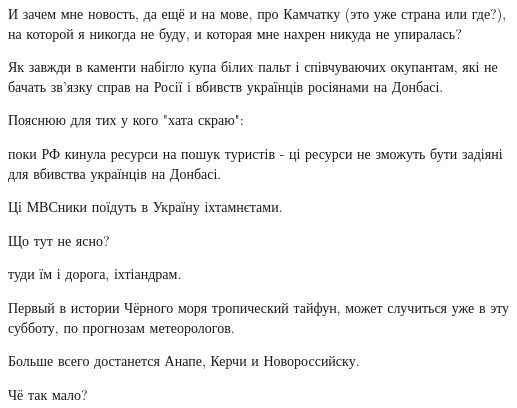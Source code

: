 \begin{itemize}
И зачем мне новость, да ещё и на мове, про Камчатку (это уже страна или где?),
на которой я никогда не буду, и которая мне нахрен никуда не упиралась?

 

Як завжди в каменти набігло купа білих пальт і співчуваючих окупантам, які не
бачать зв'язку справ на Росії і вбивств українців росіянами на Донбасі.

Пояснюю для тих у кого "хата скраю":

поки РФ кинула ресурси на пошук туристів - ці ресурси не зможуть бути задіяні
для вбивства українців на Донбасі.

Ці МВСники поїдуть в Україну іхтамнєтами.

Що тут не ясно?

 
туди їм і дорога, іхтіандрам.

 

Первый в истории Чёрного моря тропический тайфун, может случиться уже в эту
субботу, по прогнозам метеорологов.

Больше всего достанется Анапе, Керчи и Новороссийску.


 
Чё так мало?

 

\end{itemize}
